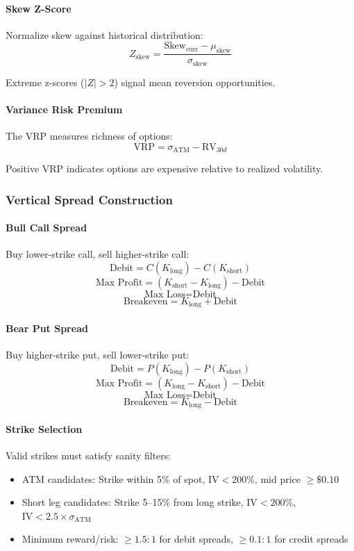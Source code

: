 \paragraph{Skew Z-Score}

Normalize skew against historical distribution:
\[
Z_{\text{skew}} = \frac{\text{Skew}_{\text{curr}} - \mu_{\text{skew}}}{\sigma_{\text{skew}}}
\]

Extreme z-scores ($|Z| > 2$) signal mean reversion opportunities.

\paragraph{Variance Risk Premium}

The VRP measures richness of options:
\[
\text{VRP} = \sigma_{\text{ATM}} - \text{RV}_{30d}
\]

Positive VRP indicates options are expensive relative to realized volatility.

\subsubsection{Vertical Spread Construction}

\paragraph{Bull Call Spread}

Buy lower-strike call, sell higher-strike call:
\[
\text{Debit} = C(K_{\text{long}}) - C(K_{\text{short}})
\]
\[
\text{Max Profit} = (K_{\text{short}} - K_{\text{long}}) - \text{Debit}
\]
\[
\text{Max Loss} = \text{Debit}
\]
\[
\text{Breakeven} = K_{\text{long}} + \text{Debit}
\]

\paragraph{Bear Put Spread}

Buy higher-strike put, sell lower-strike put:
\[
\text{Debit} = P(K_{\text{long}}) - P(K_{\text{short}})
\]
\[
\text{Max Profit} = (K_{\text{long}} - K_{\text{short}}) - \text{Debit}
\]
\[
\text{Max Loss} = \text{Debit}
\]
\[
\text{Breakeven} = K_{\text{long}} - \text{Debit}
\]

\paragraph{Strike Selection}

Valid strikes must satisfy sanity filters:
\begin{itemize}
  \item ATM candidates: Strike within 5\% of spot, $\text{IV} < 200\%$, mid price $\geq \$0.10$
  \item Short leg candidates: Strike 5--15\% from long strike, $\text{IV} < 200\%$, $\text{IV} < 2.5 \times \sigma_{\text{ATM}}$
  \item Minimum reward/risk: $\geq 1.5:1$ for debit spreads, $\geq 0.1:1$ for credit spreads
\end{itemize}

